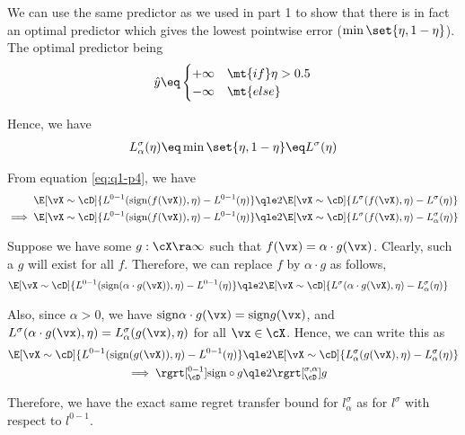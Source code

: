 \documentclass[a4paper,10pt]{article}
\begin{document}
\begin{question}
\begin{qpart}{5}
		We can use the same predictor as we used in part 1 to show that there is in fact an optimal predictor which gives the lowest pointwise error ($\min\set{\eta, 1 - \eta}$). The optimal predictor being
		\begin{align*}
			\wy	\eq	\begin{cases}
				+ \infty	& \mt{if} \eta > 0.5 \\
				- \infty	& \mt{else}
			\end{cases}
		\end{align*}

		Hence, we have
		\begin{align*}
			L_\alpha^\sigma(\eta)	\eq	\min\set{\eta, 1 - \eta}	\eq	L^\sigma(\eta)
		\end{align*}

		From equation \ref{eq:q1-p4}, we have
		\begin{align*}
			\E[\vX \sim \cD]{L^{0-1}(\sgn(f(\vX)), \eta) - L^{0-1}(\eta)}	&\qle	2 \E[\vX \sim \cD]{L^{\sigma}(f(\vX), \eta) - L^{\sigma}(\eta)} \\
			\implies \E[\vX \sim \cD]{L^{0-1}(\sgn(f(\vX)), \eta) - L^{0-1}(\eta)}	&\qle	2 \E[\vX \sim \cD]{L^{\sigma}(f(\vX), \eta) - L_\alpha^{\sigma}(\eta)}
		\end{align*}

		Suppose we have some $g : \cX \ra \infty$ such that $f(\vx) = \alpha \cdot g(\vx)$. Clearly, such a $g$ will exist for all $f$. Therefore, we can replace $f$ by $\alpha \cdot g$ as follows,
		\begin{align*}
			\E[\vX \sim \cD]{L^{0-1}(\sgn(\alpha \cdot g(\vX)), \eta) - L^{0-1}(\eta)}	&\qle	2 \E[\vX \sim \cD]{L^{\sigma}(\alpha \cdot g(\vX), \eta) - L_\alpha^{\sigma}(\eta)}
		\end{align*}

		Also, since $\alpha > 0$, we have $\sgn{\alpha \cdot g(\vx)} = \sgn{g(\vx)}$, and $L^\sigma(\alpha \cdot g(\vx), \eta) = L_\alpha^\sigma(g(\vx), \eta)$ for all $\vx \in \cX$. Hence, we can write this as
		\begin{align*}
			\E[\vX \sim \cD]{L^{0-1}(\sgn(g(\vX)), \eta) - L^{0-1}(\eta)}	&\qle	2 \E[\vX \sim \cD]{L_\alpha^{\sigma}(g(\vX), \eta) - L_\alpha^{\sigma}(\eta)} \\
			\implies \rgrt[_\cD^{0-1}]{\text{sign} \circ g}	&\qle	2 \rgrt[_\cD^{\sigma, \alpha}]{g}
		\end{align*}

		Therefore, we have the exact same regret transfer bound for $l_\alpha^\sigma$ as for $l^\sigma$ with respect to $l^{0-1}$.

	\end{qpart}

\end{question}
\end{document}

